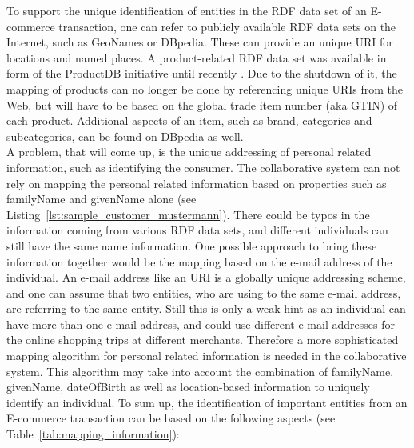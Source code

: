 To support the unique identification of entities in the \gls{RDF} data set of an \gls{E-commerce} transaction, one can refer to publicly available \gls{RDF} data sets on the Internet, such as GeoNames or DBpedia. These can provide an unique \gls{URI} for locations and named places. A product-related \gls{RDF} data set was available in form of the ProductDB initiative until recently \citep{bouzidi2014product}. Due to the shutdown of it, the mapping of products can no longer be done by referencing unique \gls{URI}s from the Web, but will have to be based on the global trade item number (aka \gls{GTIN}) of each product. Additional aspects of an item, such as brand, categories and subcategories, can be found on DBpedia as well. \\

A problem, that will come up, is the unique addressing of personal related information, such as identifying the consumer. The collaborative system can not rely on mapping the personal related information based on properties such as familyName and givenName alone (see Listing~\ref{lst:sample_customer_mustermann}). There could be typos in the information coming from various \gls{RDF} data sets, and different individuals can still have the same name information. One possible approach to bring these information together would be the mapping based on the e-mail address of the individual. An e-mail address like an \gls{URI} is a globally unique addressing scheme, and one can assume that two entities, who are using to the same e-mail address, are referring to the same entity. Still this is only a weak hint as an individual can have more than one e-mail address, and could use different e-mail addresses for the online shopping trips at different merchants. Therefore a more sophisticated mapping algorithm for personal related information is needed in the collaborative system. This algorithm may take into account the combination of familyName, givenName, dateOfBirth as well as location-based information to uniquely identify an individual. To sum up, the identification of important entities from an \gls{E-commerce} transaction can be based on the following aspects (see Table~\ref{tab:mapping_information}): \@

